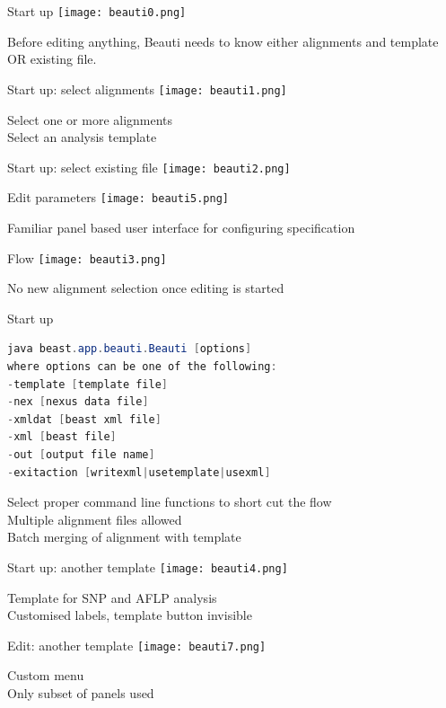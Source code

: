 \documentclass{beamer}
\theoremstyle{definition}
\begin{document}
\begin{frame}[containsverbatim]{Start up}
\texttt{[image: beauti0.png]}

Before editing anything, Beauti needs to know either alignments and template OR existing file.
\end{frame}
\begin{frame}[containsverbatim]{Start up: select alignments}
\texttt{[image: beauti1.png]}

Select one or more alignments\\
Select an analysis template
\end{frame}
\begin{frame}[containsverbatim]{Start up: select existing file}
\texttt{[image: beauti2.png]}
\end{frame}
\begin{frame}[containsverbatim]{Edit parameters}
\texttt{[image: beauti5.png]}

Familiar panel based user interface for configuring specification
\end{frame}
\begin{frame}[containsverbatim]{Flow}
\texttt{[image: beauti3.png]}

No new alignment selection once editing is started
\end{frame}

\begin{frame}[containsverbatim]{Start up}
\begin{lstlisting}[language=java]
java beast.app.beauti.Beauti [options]
where options can be one of the following:
-template [template file]
-nex [nexus data file]
-xmldat [beast xml file]
-xml [beast file]
-out [output file name]
-exitaction [writexml|usetemplate|usexml]
\end{lstlisting}

Select proper command line functions to short cut the flow\\
Multiple alignment files allowed\\
Batch merging of alignment with template

\end{frame}

\begin{frame}[containsverbatim]{Start up: another template}
\texttt{[image: beauti4.png]}

Template for SNP and AFLP analysis\\
Customised labels, template button invisible
\end{frame}
\begin{frame}[containsverbatim]{Edit: another template}
\texttt{[image: beauti7.png]}

Custom menu\\
Only subset of panels used
\end{frame}
\end{document}
